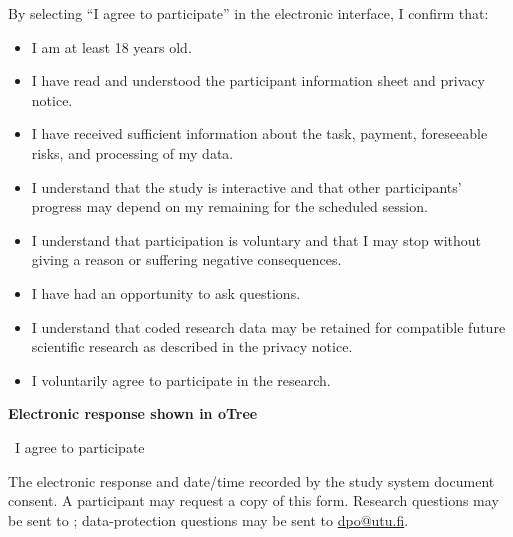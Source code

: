 \begin{infobox}
By selecting ``I agree to participate'' in the electronic interface, I confirm that:
\begin{itemize}[label=\checkbox]
  \item I am at least 18 years old.
  \item I have read and understood the participant information sheet and privacy notice.
  \item I have received sufficient information about the task, payment, foreseeable risks, and processing of my data.
  \item I understand that the study is interactive and that other participants' progress may depend on my remaining for the scheduled session.
  \item I understand that participation is voluntary and that I may stop without giving a reason or suffering negative consequences.
  \item I have had an opportunity to ask questions.
  \item I understand that coded research data may be retained for compatible future scientific research as described in the privacy notice.
  \item I voluntarily agree to participate in the research.
\end{itemize}
\end{infobox}

\vspace{0.8em}
\textbf{Electronic response shown in oTree}

\checkbox\ I agree to participate

The electronic response and date/time recorded by the study system document consent. A participant may request a copy of this form. Research questions may be sent to \StudyEmail; data-protection questions may be sent to \href{mailto:dpo@utu.fi}{dpo@utu.fi}.


